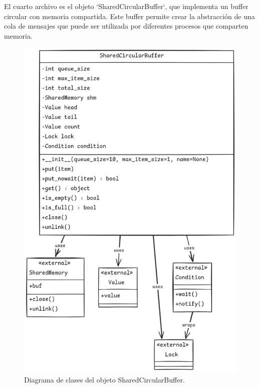 \documentclass[11pt,spanish,listoffigures,listoftables]{tfgetsinf}
\begin{document}
   

   El cuarto archivo es el objeto `SharedCircularBuffer`, que implementa un buffer circular con memoria compartida. Este buffer permite crear la abstracción de una cola de mensajes que puede ser utilizada por diferentes procesos que comparten memoria. 

   \begin{figure}[H]
      \centering
      \includegraphics[width=1\textwidth]{codigo/images/shared_circular_buffer_uml.png}
      \caption[Diagrama de clases del objeto SharedCircularBuffer]{Diagrama de clases del objeto SharedCircularBuffer.}
      \label{fig:shared_circular_buffer_uml}
   \end{figure}
\end{document}
